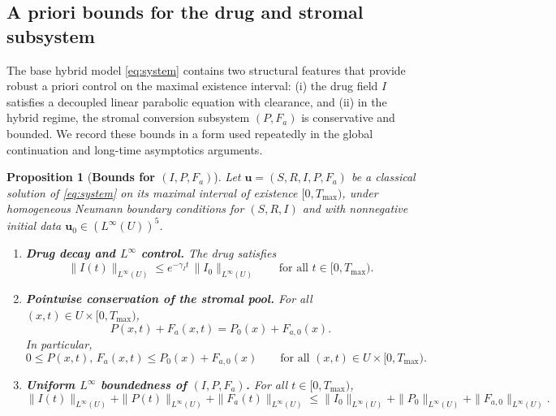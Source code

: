 \documentclass[pdflatex,sn-mathphys-ay]{sn-jnl}
\theoremstyle{thmstyleone}
\newtheorem{proposition}[theorem]{Proposition}
\theoremstyle{definition}
\theoremstyle{remark}
\begin{document}
\subsection{A priori bounds for the drug and stromal subsystem}
\label{subsec:bounds_IPA}

The base hybrid model \eqref{eq:system} contains two structural features that provide robust a priori control on the maximal existence interval: 
(i) the drug field $I$ satisfies a decoupled linear parabolic equation with clearance, and 
(ii) in the hybrid regime, the stromal conversion subsystem $(P,F_a)$ is conservative and bounded. 
We record these bounds in a form used repeatedly in the global continuation and long-time asymptotics arguments.

\begin{proposition}[\textbf{Bounds for $(I,P,F_a)$}]
\label{prop:IPA_bounds}
Let $\mathbf u=(S,R,I,P,F_a)$ be a classical solution of \eqref{eq:system} on its maximal interval of existence $[0,T_{\max})$, under homogeneous Neumann boundary conditions for $(S,R,I)$ and with nonnegative initial data $\mathbf u_0\in (L^\infty(U))^5$.

\begin{enumerate}[label=(\roman*)]
\item \textbf{Drug decay and $L^\infty$ control.}
The drug satisfies
\begin{equation}
\label{eq:I_decay}
\|I(t)\|_{L^\infty(U)} \le e^{-\gamma_I t}\,\|I_0\|_{L^\infty(U)}
\qquad \text{for all } t\in[0,T_{\max}).
\end{equation}

\item \textbf{Pointwise conservation of the stromal pool.}
For all $(x,t)\in U\times[0,T_{\max})$,
\begin{equation}
\label{eq:PA_conservation}
P(x,t)+F_a(x,t)=P_0(x)+F_{a,0}(x).
\end{equation}
In particular,
\begin{equation}
\label{eq:PA_bounds_pointwise}
0\le P(x,t),\,F_a(x,t)\le P_0(x)+F_{a,0}(x)\qquad \text{for all }(x,t)\in U\times[0,T_{\max}).
\end{equation}

\item \textbf{Uniform $L^\infty$ boundedness of $(I,P,F_a)$.}
For all $t\in[0,T_{\max})$,
\begin{equation}
\label{eq:IPA_uniform_bound}
\|I(t)\|_{L^\infty(U)}+\|P(t)\|_{L^\infty(U)}+\|F_a(t)\|_{L^\infty(U)}
\le \|I_0\|_{L^\infty(U)}+\|P_0\|_{L^\infty(U)}+\|F_{a,0}\|_{L^\infty(U)}.
\end{equation}
\end{enumerate}
\end{proposition}
\end{document}
